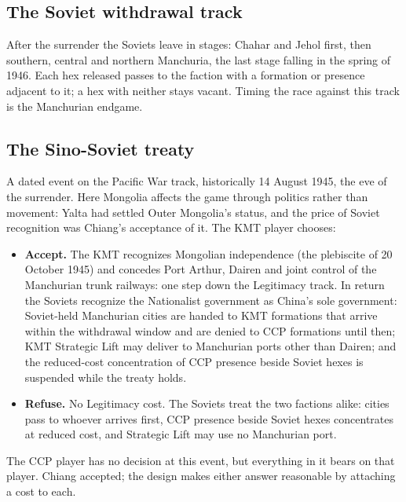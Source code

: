 \documentclass[11pt]{article}
\begin{document}
\subsection{The Soviet withdrawal track}\label{sub:withdrawal}
After the surrender the Soviets leave in stages: Chahar and Jehol first, then southern, central and northern Manchuria, the last stage falling in the spring of 1946. Each hex released passes to the faction with a formation or presence adjacent to it; a hex with neither stays vacant. Timing the race against this track is the Manchurian endgame.

\subsection{The Sino-Soviet treaty}\label{sub:treaty}
A dated event on the Pacific War track, historically 14 August 1945, the eve of the surrender. Here Mongolia affects the game through politics rather than movement: Yalta had settled Outer Mongolia's status, and the price of Soviet recognition was Chiang's acceptance of it. The KMT player chooses:
\begin{itemize}
\item \textbf{Accept.} The KMT recognizes Mongolian independence (the plebiscite of 20 October 1945) and concedes Port Arthur, Dairen and joint control of the Manchurian trunk railways: one step down the Legitimacy track. In return the Soviets recognize the Nationalist government as China's sole government: Soviet-held Manchurian cities are handed to KMT formations that arrive within the withdrawal window and are denied to CCP formations until then; KMT Strategic Lift may deliver to Manchurian ports other than Dairen; and the reduced-cost concentration of CCP presence beside Soviet hexes is suspended while the treaty holds.
\item \textbf{Refuse.} No Legitimacy cost. The Soviets treat the two factions alike: cities pass to whoever arrives first, CCP presence beside Soviet hexes concentrates at reduced cost, and Strategic Lift may use no Manchurian port.
\end{itemize}
The CCP player has no decision at this event, but everything in it bears on that player. Chiang accepted; the design makes either answer reasonable by attaching a cost to each.
\end{document}
